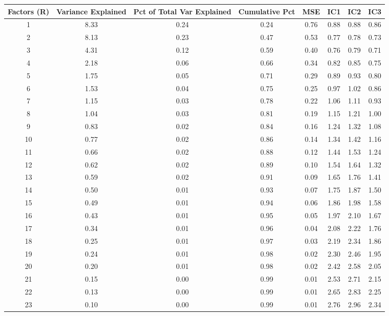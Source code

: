 \documentclass[11pt, letterpaper]{article}\usepackage[]{graphicx}\usepackage[]{color}
\begin{document}
\begin{table}[H]
\centering
\begingroup\scriptsize
\begin{tabular}{cccccccc}
  \hline
Factors (R) & Variance Explained & Pct of Total Var Explained & Cumulative Pct & MSE & IC1 & IC2 & IC3 \\ 
  \hline
  1 & 8.33 & 0.24 & 0.24 & 0.76 & 0.88 & 0.88 & 0.86 \\ 
    2 & 8.13 & 0.23 & 0.47 & 0.53 & 0.77 & 0.78 & 0.73 \\ 
    3 & 4.31 & 0.12 & 0.59 & 0.40 & 0.76 & 0.79 & 0.71 \\ 
    4 & 2.18 & 0.06 & 0.66 & 0.34 & 0.82 & 0.85 & 0.75 \\ 
    5 & 1.75 & 0.05 & 0.71 & 0.29 & 0.89 & 0.93 & 0.80 \\ 
    6 & 1.53 & 0.04 & 0.75 & 0.25 & 0.97 & 1.02 & 0.86 \\ 
    7 & 1.15 & 0.03 & 0.78 & 0.22 & 1.06 & 1.11 & 0.93 \\ 
    8 & 1.04 & 0.03 & 0.81 & 0.19 & 1.15 & 1.21 & 1.00 \\ 
    9 & 0.83 & 0.02 & 0.84 & 0.16 & 1.24 & 1.32 & 1.08 \\ 
   10 & 0.77 & 0.02 & 0.86 & 0.14 & 1.34 & 1.42 & 1.16 \\ 
   11 & 0.66 & 0.02 & 0.88 & 0.12 & 1.44 & 1.53 & 1.24 \\ 
   12 & 0.62 & 0.02 & 0.89 & 0.10 & 1.54 & 1.64 & 1.32 \\ 
   13 & 0.59 & 0.02 & 0.91 & 0.09 & 1.65 & 1.76 & 1.41 \\ 
   14 & 0.50 & 0.01 & 0.93 & 0.07 & 1.75 & 1.87 & 1.50 \\ 
   15 & 0.49 & 0.01 & 0.94 & 0.06 & 1.86 & 1.98 & 1.58 \\ 
   16 & 0.43 & 0.01 & 0.95 & 0.05 & 1.97 & 2.10 & 1.67 \\ 
   17 & 0.34 & 0.01 & 0.96 & 0.04 & 2.08 & 2.22 & 1.76 \\ 
   18 & 0.25 & 0.01 & 0.97 & 0.03 & 2.19 & 2.34 & 1.86 \\ 
   19 & 0.24 & 0.01 & 0.98 & 0.02 & 2.30 & 2.46 & 1.95 \\ 
   20 & 0.20 & 0.01 & 0.98 & 0.02 & 2.42 & 2.58 & 2.05 \\ 
   21 & 0.15 & 0.00 & 0.99 & 0.01 & 2.53 & 2.71 & 2.15 \\ 
   22 & 0.13 & 0.00 & 0.99 & 0.01 & 2.65 & 2.83 & 2.25 \\ 
   23 & 0.10 & 0.00 & 0.99 & 0.01 & 2.76 & 2.96 & 2.34 \\ 

\end{tabular}
\end{table}
\end{document}
